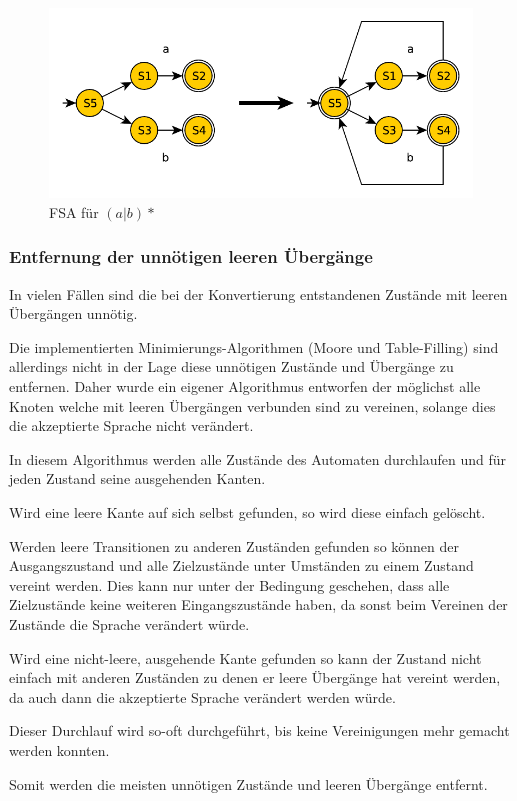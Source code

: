 \begin{figure}[h]
  \centering
  \includegraphics{objectsToInclude/re_fsa_(aOrb)STAR.pdf}
  \caption{FSA für $(a|b)*$}
\label{fig:Kleene-Stern}
\end{figure}

\subsubsection{Entfernung der unnötigen leeren Übergänge}
In vielen Fällen sind die bei der Konvertierung entstandenen Zustände mit leeren
Übergängen unnötig.

Die implementierten Minimierungs-Algorithmen (Moore und Table-Filling) sind
allerdings nicht in der Lage diese unnötigen Zustände und Übergänge zu entfernen.
Daher wurde ein eigener Algorithmus entworfen der möglichst alle Knoten welche mit
leeren Übergängen verbunden sind zu vereinen, solange dies die akzeptierte Sprache
nicht verändert.

In diesem Algorithmus werden alle Zustände des Automaten durchlaufen und für
jeden Zustand seine ausgehenden Kanten.

Wird eine leere Kante auf sich selbst gefunden, so wird diese einfach gelöscht.

Werden leere Transitionen zu anderen Zuständen gefunden so können der
Ausgangszustand und alle Zielzustände unter Umständen zu einem Zustand vereint
werden. Dies kann nur unter der Bedingung geschehen, dass alle Zielzustände keine
weiteren Eingangszustände haben, da sonst beim Vereinen der Zustände die Sprache
verändert würde.

Wird eine nicht-leere, ausgehende Kante gefunden so kann der Zustand nicht einfach
mit anderen Zuständen zu denen er leere Übergänge hat vereint werden, da auch
dann die akzeptierte Sprache verändert werden würde.

Dieser Durchlauf wird so-oft durchgeführt, bis keine Vereinigungen mehr gemacht
werden konnten.

Somit werden die meisten unnötigen Zustände und leeren Übergänge entfernt.


